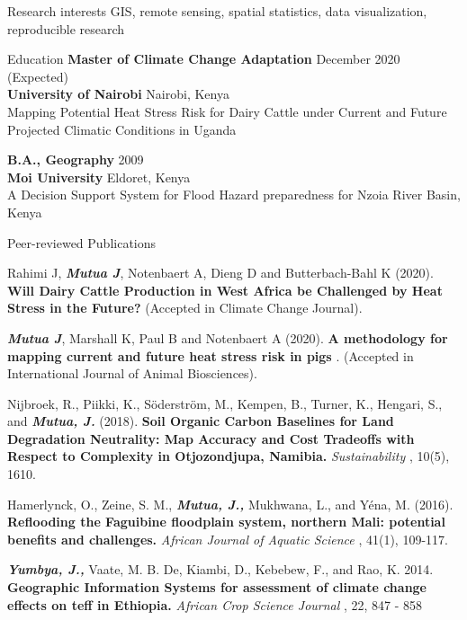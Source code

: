\documentclass{resume} %
\begin{document}
\begin{rSection}{Research interests}
GIS, remote sensing, spatial statistics, data visualization, reproducible research
\end{rSection}


\begin{rSection}{Education}
{\bf Master of Climate Change Adaptation} \hfill December 2020 (Expected)\\ 
{\bf University of Nairobi} \hfill Nairobi, Kenya \\
{Mapping Potential Heat Stress Risk for Dairy Cattle under Current and Future Projected Climatic Conditions in Uganda} \smallskip 

{\bf B.A., Geography} \hfill  2009 \\
{\bf Moi University} \hfill Eldoret, Kenya \\
{A Decision Support System for Flood Hazard preparedness for Nzoia River Basin, Kenya}
\smallskip 
\end{rSection}


\begin{rSection}{Peer-reviewed Publications}

Rahimi J, {\bf \em{Mutua J}}, Notenbaert A, Dieng D and Butterbach-Bahl K (2020). { \bf Will Dairy Cattle Production in West Africa be Challenged by Heat Stress in the Future? } (Accepted in Climate Change Journal).

{\bf \em{Mutua J}}, Marshall K, Paul B and Notenbaert A (2020). { \bf A methodology for mapping current and future heat stress risk in pigs }. (Accepted in International Journal of Animal Biosciences).

Nijbroek, R., Piikki, K., S\"oderstr\"om, M., Kempen, B., Turner, K., Hengari, S., and {\bf \em{Mutua, J.}} (2018). { \bf Soil Organic Carbon Baselines for Land Degradation Neutrality: Map Accuracy and Cost Tradeoffs with Respect to Complexity in Otjozondjupa, Namibia. } {\em Sustainability }, 10(5), 1610.

Hamerlynck, O., Zeine, S. M., {\bf \em{Mutua, J.,}} Mukhwana, L., and Y\'ena, M. (2016). { \bf Reflooding the Faguibine floodplain system, northern Mali: potential benefits and challenges. } {\em African Journal of Aquatic Science }, 41(1), 109-117.

{\bf \em{Yumbya, J.,}} Vaate, M. B. De, Kiambi, D., Kebebew, F., and Rao, K. 2014. { \bf Geographic Information Systems for assessment of climate change effects on teff in Ethiopia. } {\em African Crop Science Journal }, 22, 847 - 858

\end{rSection}
\end{document}
